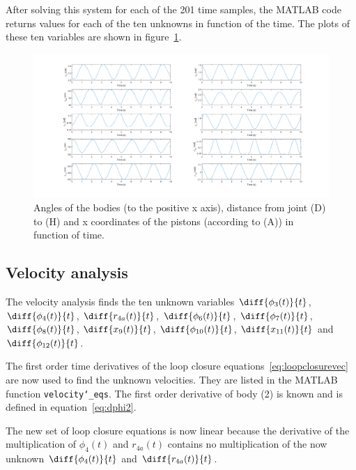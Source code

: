 \documentclass[a4paper]{article}
\begin{document}
After solving this system for each of the 201 time samples, the MATLAB code returns values for each of the ten unknowns in function of the time. The plots of these ten variables are shown in figure~\ref{fig:kinpos}.

\begin{figure}
	\centering
	
	\includegraphics[width = \textwidth]{kinpos.png}
	
	\caption{Angles of the bodies (to the positive x axis), distance from joint (D) to (H) and x coordinates of the pistons (according to (A)) in function of time.}
	\label{fig:kinpos}
	
\end{figure}



\subsection{Velocity analysis}

The velocity analysis finds the ten unknown variables \(\diff{\phi_3(t)}{t}\), \(\diff{\phi_4(t)}{t}\), \(\diff{r_{4a}(t)}{t}\), \(\diff{\phi_6(t)}{t}\), \(\diff{\phi_7(t)}{t}\), \(\diff{\phi_8(t)}{t}\), \(\diff{x_9(t)}{t}\), \(\diff{\phi_{10}(t)}{t}\), \(\diff{x_{11}(t)}{t}\) and \(\diff{\phi_{12}(t)}{t}\).

The first order time derivatives of the loop closure equations~\ref{eq:loopclosurevec} are now used to find the unknown velocities. They are listed in the MATLAB function \texttt{velocity\char`_eqs}. The first order derivative of body (2) is known and is defined in equation~\ref{eq:dphi2}. 

The new set of loop closure equations is now linear because the derivative of the multiplication of \(\phi_4(t)\) and \(r_{4a}(t)\) contains no multiplication of the now unknown \(\diff{\phi_4(t)}{t}\) and \(\diff{r_{4a}(t)}{t}\).
\end{document}

